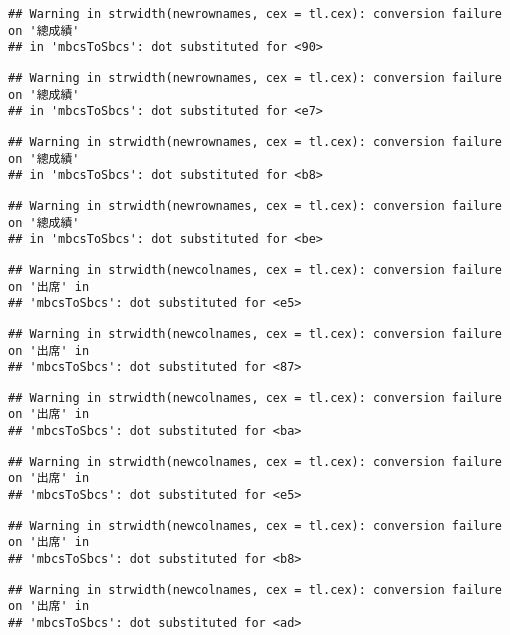 \documentclass[
]{book}
\begin{document}
\begin{verbatim}
## Warning in strwidth(newrownames, cex = tl.cex): conversion failure on '總成績'
## in 'mbcsToSbcs': dot substituted for <90>
\end{verbatim}

\begin{verbatim}
## Warning in strwidth(newrownames, cex = tl.cex): conversion failure on '總成績'
## in 'mbcsToSbcs': dot substituted for <e7>
\end{verbatim}

\begin{verbatim}
## Warning in strwidth(newrownames, cex = tl.cex): conversion failure on '總成績'
## in 'mbcsToSbcs': dot substituted for <b8>
\end{verbatim}

\begin{verbatim}
## Warning in strwidth(newrownames, cex = tl.cex): conversion failure on '總成績'
## in 'mbcsToSbcs': dot substituted for <be>
\end{verbatim}

\begin{verbatim}
## Warning in strwidth(newcolnames, cex = tl.cex): conversion failure on '出席' in
## 'mbcsToSbcs': dot substituted for <e5>
\end{verbatim}

\begin{verbatim}
## Warning in strwidth(newcolnames, cex = tl.cex): conversion failure on '出席' in
## 'mbcsToSbcs': dot substituted for <87>
\end{verbatim}

\begin{verbatim}
## Warning in strwidth(newcolnames, cex = tl.cex): conversion failure on '出席' in
## 'mbcsToSbcs': dot substituted for <ba>
\end{verbatim}

\begin{verbatim}
## Warning in strwidth(newcolnames, cex = tl.cex): conversion failure on '出席' in
## 'mbcsToSbcs': dot substituted for <e5>
\end{verbatim}

\begin{verbatim}
## Warning in strwidth(newcolnames, cex = tl.cex): conversion failure on '出席' in
## 'mbcsToSbcs': dot substituted for <b8>
\end{verbatim}

\begin{verbatim}
## Warning in strwidth(newcolnames, cex = tl.cex): conversion failure on '出席' in
## 'mbcsToSbcs': dot substituted for <ad>
\end{verbatim}
\end{document}
